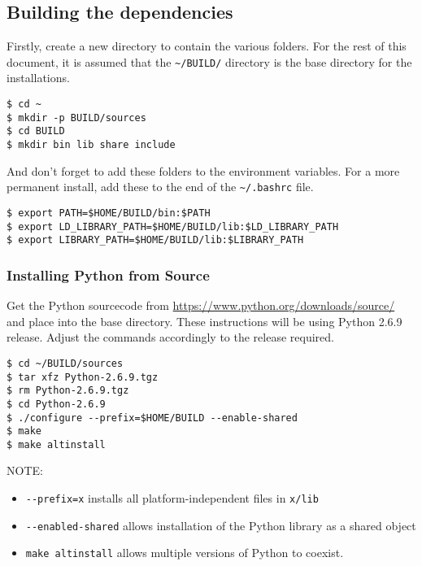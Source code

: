 \subsection{Building the dependencies}
\label{sec:building_the_dependencies}

Firstly, create a new directory to contain the various folders. For the rest of this document, it is assumed that the \lstinline{~/BUILD/} directory is the base directory for the installations.

\begin{lstlisting}[style=inlineBash]
$ cd ~
$ mkdir -p BUILD/sources
$ cd BUILD
$ mkdir bin lib share include
\end{lstlisting}

And don't forget to add these folders to the environment variables. For a more permanent install, add these to the end of the \lstinline{~/.bashrc} file.

\begin{lstlisting}[style=inlineBash]
$ export PATH=$HOME/BUILD/bin:$PATH
$ export LD_LIBRARY_PATH=$HOME/BUILD/lib:$LD_LIBRARY_PATH
$ export LIBRARY_PATH=$HOME/BUILD/lib:$LIBRARY_PATH
\end{lstlisting}

\subsubsection{Installing Python from Source}
\label{sub:installing_python_from_source}

Get the Python sourcecode from \url{https://www.python.org/downloads/source/} and place into the base directory. These instructions will be using Python 2.6.9 release. Adjust the commands accordingly to the release required.

\begin{lstlisting}[style=inlineBash]
$ cd ~/BUILD/sources
$ tar xfz Python-2.6.9.tgz
$ rm Python-2.6.9.tgz
$ cd Python-2.6.9
$ ./configure --prefix=$HOME/BUILD --enable-shared
$ make
$ make altinstall
\end{lstlisting}

NOTE:
\begin{itemize}[noitemsep,nolistsep]
	\item \lstinline{--prefix=x} installs all platform-independent files in \lstinline{x/lib}
	\item \lstinline{--enabled-shared} allows installation of the Python library as a shared object
	\item \lstinline{make altinstall} allows multiple versions of Python to coexist.
\end{itemize}


